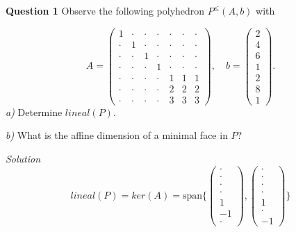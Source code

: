 \documentclass[a4paper, draft]{article}
\begin{document}
\textbf{Question 1 } Observe the following polyhedron $P^{\leq}(A, b)$ with 

\begin{equation*} 
    A = \begin{pmatrix}
        1 & \cdot & \cdot & \cdot & \cdot & \cdot & \cdot \\
        \cdot & 1 & \cdot & \cdot & \cdot & \cdot & \cdot \\
        \cdot & \cdot & 1 & \cdot & \cdot & \cdot & \cdot \\
        \cdot & \cdot & \cdot & 1 & \cdot & \cdot & \cdot \\
        \cdot & \cdot & \cdot & \cdot & 1 & 1 & 1 \\
        \cdot & \cdot & \cdot & \cdot & 2 & 2 & 2 \\
        \cdot & \cdot & \cdot & \cdot & 3 & 3 & 3 
    \end{pmatrix}
    , \quad b = \begin{pmatrix}
        2 \\
        4 \\
        6 \\
        1 \\
        2 \\
        8 \\
        1 
    \end{pmatrix}.
\end{equation*}
\textit{a)} Determine $lineal(P)$.

\textit{b)} What is the affine dimension of a minimal face in $P$? \newline\newline

\textit{Solution} 
\begin{equation*}
    lineal(P) = ker(A) = \text{span}\{
    \begin{pmatrix}
        \cdot \\
        \cdot \\
        \cdot \\
        \cdot \\
        1 \\
        -1 \\
        \cdot 
    \end{pmatrix}, \begin{pmatrix}
        \cdot \\
        \cdot \\
        \cdot \\
        \cdot \\
        1 \\
        \cdot \\
        -1
    \end{pmatrix}\}
\end{equation*}
\end{document}
